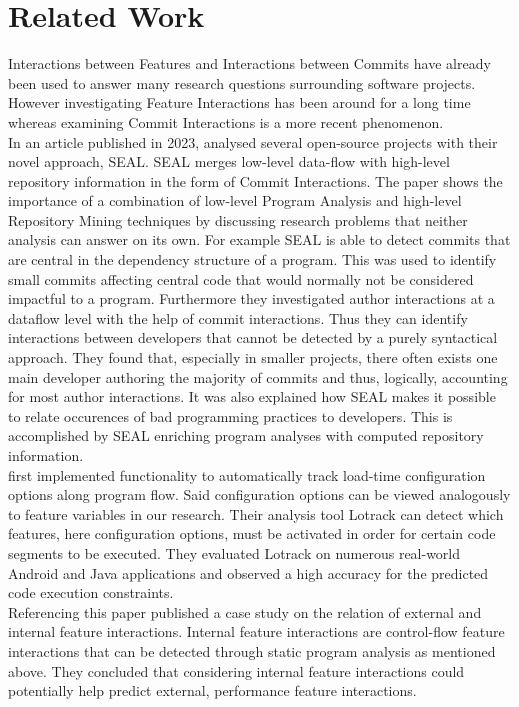 \section*{Related Work}\label{ch:relatedwork}

Interactions between Features and Interactions between Commits have already been used to answer many research questions surrounding software projects.
However investigating Feature Interactions has been around for a long time whereas examining Commit Interactions is a more recent phenomenon. \\
In an article published in 2023, \citet{sattler2023seal} analysed several open-source projects with their novel approach, SEAL.
SEAL merges low-level data-flow with high-level repository information in the form of Commit Interactions.
The paper shows the importance of a combination of low-level Program Analysis and high-level Repository Mining techniques by discussing research problems that neither analysis can answer on its own.
For example SEAL is able to detect commits that are central in the dependency structure of a program.
This was used to identify small commits affecting central code that would normally not be considered impactful to a program.
Furthermore they investigated author interactions at a dataflow level with the help of commit interactions.
Thus they can identify interactions between developers that cannot be detected by a purely syntactical approach.
They found that, especially in smaller projects, there often exists one main developer authoring the majority of commits and thus, logically, accounting for most author interactions. 
It was also explained how SEAL makes it possible to relate occurences of bad programming practices to developers. 
This is accomplished by SEAL enriching program analyses with computed repository information. \\
\citet{lillack2014tracking} first implemented functionality to automatically track load-time configuration options along program flow.
Said configuration options can be viewed analogously to feature variables in our research. 
Their analysis tool Lotrack can detect which features, here configuration options, must be activated in order for certain code segments to be executed.
They evaluated Lotrack on numerous real-world Android and Java applications and observed a high accuracy for the predicted code execution constraints. \\
Referencing this paper \citet{kolesnikov2017relation} published a case study on the relation of external and internal feature interactions.
Internal feature interactions are control-flow feature interactions that can be detected through static program analysis as mentioned above.
They concluded that considering internal feature interactions could potentially help predict external, performance feature interactions.
